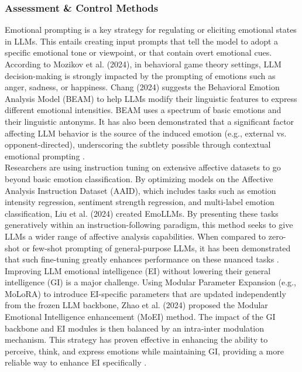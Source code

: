 \documentclass{DESSThesis}
\begin{document}
\subsubsection{Assessment \& Control Methods}
Emotional prompting is a key strategy for regulating or eliciting emotional states in LLMs. This entails creating input prompts that tell the model to adopt a specific emotional tone or viewpoint, or that contain overt emotional cues. According to Mozikov et al. (2024), in behavioral game theory settings, LLM decision-making is strongly impacted by the prompting of emotions such as anger, sadness, or happiness. Chang (2024) suggests the Behavioral Emotion Analysis Model (BEAM) to help LLMs modify their linguistic features to express different emotional intensities. BEAM uses a spectrum of basic emotions and their linguistic antonyms. It has also been demonstrated that a significant factor affecting LLM behavior is the source of the induced emotion (e.g., external vs. opponent-directed), underscoring the subtlety possible through contextual emotional prompting \cite{mozikov_good_2024}.
\\
Researchers are using instruction tuning on extensive affective datasets to go beyond basic emotion classification. By optimizing models on the Affective Analysis Instruction Dataset (AAID), which includes tasks such as emotion intensity regression, sentiment strength regression, and multi-label emotion classification, Liu et al. (2024) created EmoLLMs. By presenting these tasks generatively within an instruction-following paradigm, this method seeks to give LLMs a wider range of affective analysis capabilities. When compared to zero-shot or few-shot prompting of general-purpose LLMs, it has been demonstrated that such fine-tuning greatly enhances performance on these nuanced tasks \cite{liu_emollms_2024}.
\\
Improving LLM emotional intelligence (EI) without lowering their general intelligence (GI) is a major challenge. Using Modular Parameter Expansion (e.g., MoLoRA) to introduce EI-specific parameters that are updated independently from the frozen LLM backbone, Zhao et al. (2024) proposed the Modular Emotional Intelligence enhancement (MoEI) method. The impact of the GI backbone and EI modules is then balanced by an intra-inter modulation mechanism. This strategy has proven effective in enhancing the ability to perceive, think, and express emotions while maintaining GI, providing a more reliable way to enhance EI specifically \cite{zhao_both_2024}.
\\
\end{document}
